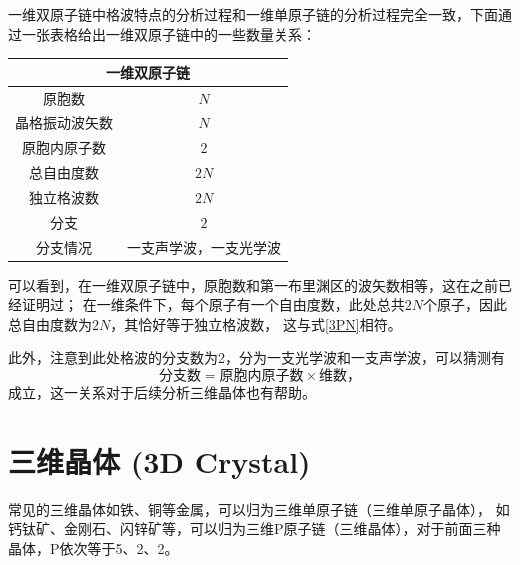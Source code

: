 \documentclass[declarePage]{ecnuthesis}
\begin{document}
一维双原子链中格波特点的分析过程和一维单原子链的分析过程完全一致，下面通过一张表格给出一维双原子链中的一些数量关系：
\begin{table}[htb]
    \centering
    \begin{tabular}{|c|c|}
        \hline
        \multicolumn{2}{|c|}{一维双原子链}  \\ 
        \hline
        原胞数        & $N$                 \\ 
        \hline
        晶格振动波矢数 & $N$                 \\ 
        \hline
        原胞内原子数   & $2$                 \\ 
        \hline
        总自由度数     & $2N$                \\ 
        \hline
        独立格波数     & $2N$                \\ 
        \hline
        分支          & $2$                 \\ 
        \hline
        分支情况      & 一支声学波，一支光学波\\ 
        \hline
    \end{tabular}
\end{table}

可以看到，在一维双原子链中，原胞数和第一布里渊区的波矢数相等，这在之前已经证明过；%
在一维条件下，每个原子有一个自由度数，此处总共$2N$个原子，因此总自由度数为$2N$，其恰好等于独立格波数，%
这与式\ref{3PN}相符。

此外，注意到此处格波的分支数为2，分为一支光学波和一支声学波，可以猜测有
\begin{equation}
    \text{分支数} = \text{原胞内原子数} \times \text{维数，} \label{Bran}
\end{equation}
成立，这一关系对于后续分析三维晶体也有帮助。

\newpage

\section{三维晶体 (3D Crystal)}

常见的三维晶体如铁、铜等金属，可以归为三维单原子链（三维单原子晶体），%
如钙钛矿、金刚石、闪锌矿等，可以归为三维P原子链（三维晶体），对于前面三种晶体，P依次等于5、2、2。
\end{document}
